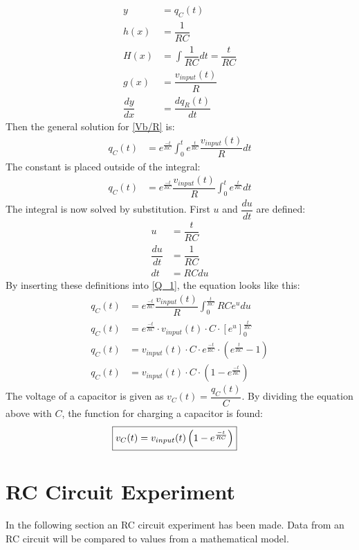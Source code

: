 
\begin{align*}
y &= q_C(t)
\\
h(x) &= \dfrac{1}{RC}
\\
H(x) &= \int \dfrac{1}{RC}dt=\dfrac{t}{RC}
\\
g(x) &= \dfrac{v_{input}(t)}{R}
\\
\dfrac{dy}{dx} &= \dfrac{dq_R(t)}{dt}
\end{align*}
Then the general solution for \eqref{Vb/R} is:
\begin{align*}
q_C(t) &= e^{\frac{-t}{RC}}\int_{0}^{t}e^{\frac{t}{RC}}\dfrac{v_{input}(t)}{R}dt
\end{align*}
The constant is placed outside of the integral:
\begin{align}
q_C(t) &= e^{\frac{-t}{RC}}\dfrac{v_{input}(t)}{R}\int_{0}^{t}e^{\frac{t}{RC}}dt \label{Q_1}
\end{align}
The integral is now solved by substitution. First $u$ and $\dfrac{du}{dt}$ are defined:
\begin{align*}
u &= \dfrac{t}{RC}
\\
\dfrac{du}{dt}&=\dfrac{1}{RC}
\\
dt &=RC du
\end{align*} 
By inserting these definitions into \eqref{Q_1}, the equation looks like this:
\begin{align*}
q_C(t) &= e^{\frac{-t}{RC}}\dfrac{v_{input}(t)}{R}\int_{0}^{\frac{t}{RC}}RCe^u du
\\
q_C(t) &= e^{\frac{-t}{RC}}\cdot v_{input}(t)\cdot C\cdot \left[e^u\right]_{0}^{\frac{t}{RC}}
\\
q_C(t) &= v_{input}(t) \cdot C\cdot e^{\frac{-t}{RC}}\cdot\left(e^{\frac{t}{RC}}-1\right)
\\
q_C(t) &= v_{input}(t) \cdot C \cdot \left(1-e^{\frac{-t}{RC}}\right)
\end{align*} 
The voltage of a capacitor is given as $v_C(t)=\dfrac{q_C(t)}{C}$. By dividing the equation above with $C$, the function for charging a capacitor is found:
\begin{align}
\label{V_up}
\Aboxed{
v_C(t)=v_{input}(t)\left(1-e^{\frac{-t}{RC}}\right)
}
\end{align}
\section{RC Circuit Experiment} \label{c: RC_exp}
In the following section an RC circuit experiment has been made. Data from an RC circuit will be compared to values from a mathematical model.

